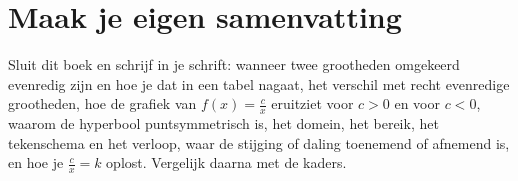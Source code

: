 \ifzelfstudie
\section*{Maak je eigen samenvatting}
Sluit dit boek en schrijf in je schrift: wanneer twee grootheden omgekeerd evenredig zijn en hoe je dat in een tabel nagaat, het verschil met recht evenredige grootheden, hoe de grafiek van $f(x) = \tfrac cx$ eruitziet voor $c > 0$ en voor $c < 0$, waarom de hyperbool puntsymmetrisch is, het domein, het bereik, het tekenschema en het verloop, waar de stijging of daling toenemend of afnemend is, en hoe je $\tfrac cx = k$ oplost. Vergelijk daarna met de kaders.
\fi
